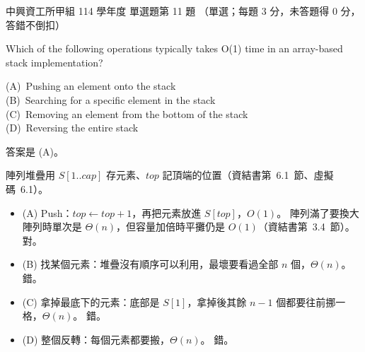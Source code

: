 \begin{pastexam}[label={px:nchu-114-dsa-11}]{中興資工所甲組 114 學年度 單選題第 11 題}
（單選；每題 3 分，未答題得 0 分，答錯不倒扣）

Which of the following operations typically takes O(1) time in an array-based stack implementation?

(A)~Pushing an element onto the stack\\
(B)~Searching for a specific element in the stack\\
(C)~Removing an element from the bottom of the stack\\
(D)~Reversing the entire stack
\end{pastexam}

\begin{pastsoln}
答案是 (A)。

陣列堆疊用 $S[1..\mathit{cap}]$ 存元素、$\mathit{top}$ 記頂端的位置（資結書第~6.1~節、虛擬碼~6.1）。
\begin{itemize}
\item (A) Push：$\mathit{top} \gets \mathit{top} + 1$，再把元素放進 $S[\mathit{top}]$，$O(1)$。 陣列滿了要換大
陣列時單次是 $\Theta(n)$，但容量加倍時平攤仍是 $O(1)$（資結書第~3.4~節）。 對。
\item (B) 找某個元素：堆疊沒有順序可以利用，最壞要看過全部 $n$ 個，$\Theta(n)$。 錯。
\item (C) 拿掉最底下的元素：底部是 $S[1]$，拿掉後其餘 $n - 1$ 個都要往前挪一格，$\Theta(n)$。 錯。
\item (D) 整個反轉：每個元素都要搬，$\Theta(n)$。 錯。
\end{itemize}
\end{pastsoln}
